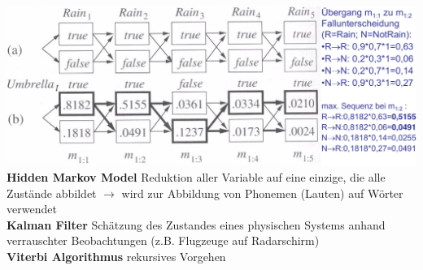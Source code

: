 \documentclass[12pt]{article}
\begin{document}
	\includegraphics[width=\textwidth]{figures/wahrscheinlichste-sequenz.png}\\
	\textbf{Hidden Markov Model} Reduktion aller Variable auf eine einzige, die alle Zustände abbildet $\rightarrow$ wird zur Abbildung von Phonemen (Lauten) auf Wörter verwendet\\
	\textbf{Kalman Filter} Schätzung des Zustandes eines physischen Systems anhand verrauschter Beobachtungen (z.B. Flugzeuge auf Radarschirm)\\
	\textbf{Viterbi Algorithmus} rekursives Vorgehen
	
\end{document}
